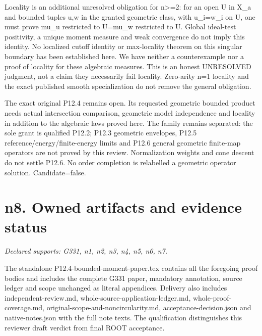 \documentclass[11pt]{article}
\begin{document}
Locality is an additional unresolved obligation for n>=2: for an open U in X\_a and bounded tuples u,w in the granted geometric class, with u\_i=w\_i on U, one must prove mu\_u restricted to U=mu\_w restricted to U. Global ideal-test positivity, a unique moment measure and weak convergence do not imply this identity. No localized cutoff identity or max-locality theorem on this singular boundary has been established here. We have neither a counterexample nor a proof of locality for these algebraic measures. This is an honest UNRESOLVED judgment, not a claim they necessarily fail locality. Zero-arity n=1 locality and the exact published smooth specialization do not remove the general obligation.

The exact original P12.4 remains open. Its requested geometric bounded product needs actual intersection comparison, geometric model independence and locality in addition to the algebraic laws proved here. The family remains separated: the sole grant is qualified P12.2; P12.3 geometric envelopes, P12.5 reference/energy/finite-energy limits and P12.6 general geometric finite-map operators are not proved by this review. Normalization weights and cone descent do not settle P12.6. No order completion is relabelled a geometric operator solution. Candidate=false.

\section{n8. Owned artifacts and evidence status}
\textit{Declared supports: G331, n1, n2, n3, n4, n5, n6, n7.}

The standalone P12.4-bounded-moment-paper.tex contains all the foregoing proof bodies and includes the complete G331 paper, mandatory annotation, source ledger and scope unchanged as literal appendices. Delivery also includes independent-review.md, whole-source-application-ledger.md, whole-proof-coverage.md, original-scope-and-noncircularity.md, acceptance-decision.json and native-notes.json with the full note texts. The qualification distinguishes this reviewer draft verdict from final ROOT acceptance.
\end{document}
